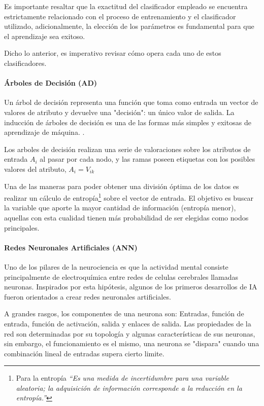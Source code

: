 Es importante resaltar que la exactitud del clasificador empleado se encuentra estrictamente relacionado con el proceso de entrenamiento y el clasificador utilizado, adicionalmente, la elección de los parámetros es fundamental para que el aprendizaje sea exitoso. \parencite[7]{Flach2012MachineLearning}

Dicho lo anterior, es imperativo revisar cómo opera cada uno de estos clasificadores.
\paragraph{Árboles de Decisión (AD)}
Un árbol de decisión representa una función que toma como entrada un vector de valores de atributo y devuelve una "decisión": un único valor de salida. La inducción de árboles de decisión es una de las formas más simples y exitosas de aprendizaje de máquina. \parencite[697]{Russel2010Artificial_Intelligence_3rd}.

Los arboles de decisión realizan una serie de valoraciones sobre los atributos de entrada $A_i$ al pasar por cada nodo, y las ramas poseen etiquetas con los posibles valores del atributo, $A_i = V_{ik}$

Una de las maneras para poder obtener una división óptima de los datos es realizar un cálculo de entropía\footnote{Para \parencite[703]{Russel2010Artificial_Intelligence_3rd} la entropía \textit{“Es una medida de incertidumbre para una variable
aleatoria; la adquisición de información corresponde a la reducción en la entropía.”}} sobre el vector de entrada. El objetivo es buscar la variable que aporte la mayor cantidad de información (entropía menor), aquellas con esta cualidad tienen más probabilidad de ser elegidas como nodos principales.

\paragraph{Redes Neuronales Artificiales (ANN)}
Uno de los pilares de la neurociencia es que la actividad mental consiste principalmente de electroquímica entre redes de celulas cerebrales llamadas neuronas. Inspirados por esta hipótesis, algunos de los primeros desarrollos de IA fueron orientados a crear redes neuronales artificiales.  \parencite[727]{Russel2010Artificial_Intelligence_3rd}

A grandes rasgos, los componentes de una neurona son: Entradas, función de entrada, función de activación, salida y enlaces de salida. Las propiedades de la red son determinadas por su topología y algunas características de sus neuronas, sin embargo, el funcionamiento es el mismo, una neurona se "dispara" cuando una combinación lineal de entradas supera cierto limite.

